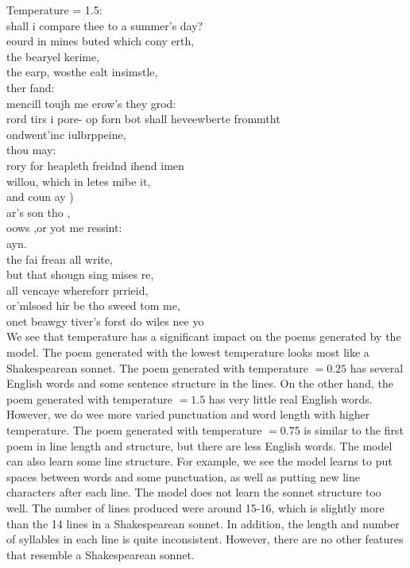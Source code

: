 \documentclass{article}
\begin{document}
Temperature = 1.5:\\
shall i compare thee to a summer's day?\\
eourd in mines buted which cony erth,\\
the bearyel kerime,\\
the earp, wosthe ealt insimstle,\\
ther fand:\\
mencill toujh me erow's they grod:\\
rord tirs i pore- op forn bot shall heveewberte frommtht\\ ondwent'inc iulbrppeine,\\
thou may:\\
rory for heapleth freidnd ihend imen\\
willou, which in letes mibe it,\\
and coun ay )\\
ar's son tho ,\\
oows ,or yot me ressint:\\
ayn.\\
the fai frean all write,\\
but that shougn sing mises re,\\
all vencaye whereforr prrieid,\\
or'mlsosd hir be tho sweed tom me,\\
onet beawgy tiver's forst do wiles nee yo\\


We see that temperature has a significant impact on the poems generated by the model. The poem generated with the lowest temperature looks most like a Shakespearean sonnet. The poem generated with temperature $=0.25$ has several English words and some sentence structure in the lines. On the other hand, the poem generated with temperature $=1.5$ has very little real English words. However, we do wee more varied punctuation and word length with higher temperature. The poem generated with temperature $=0.75$ is similar to the first poem in line length and structure, but there are less English words. The model can also learn some line structure. For example, we see the model learns to put spaces between words and some punctuation, as well as putting new line characters after each line. The model does not learn the sonnet structure too well. The number of lines produced were around 15-16, which is slightly more than the 14 lines in a Shakespearean sonnet. In addition, the length and number of syllables in each line is quite inconsistent. However, there are no other features that resemble a Shakespearean sonnet.\\
\end{document}

